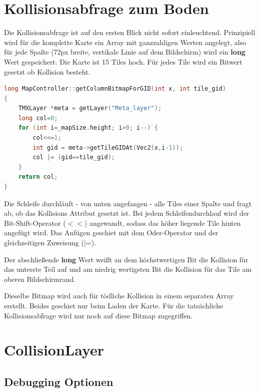 \section{Kollisionsabfrage zum Boden}\label{sec:4_Kollisionsabfrage}

Die Kollisionsabfrage ist auf den ersten Blick nicht sofort einleuchtend. Prinzipiell wird für die komplette Karte ein Array mit ganzzahligen Werten angelegt, also für jede Spalte (72px breite, vertikale Linie auf dem Bildschirm) wird ein \textbf{long} Wert gespeichert.
Die Karte ist 15 Tiles hoch. Für jedes Tile wird ein Bitwert gesetzt ob Kollision besteht.

\begin{lstlisting}[label=lst:collision_detection,
				   language=C++,
				   firstnumber=271,
				   caption=Collision Column abfragen ( MapController.cpp )]
long MapController::getColumnBitmapForGID(int x, int tile_gid)
{
	TMXLayer *meta = getLayer("Meta_layer");
	long col=0;
	for (int i=_mapSize.height; i>0; i--) {
		col<<=1;
		int gid = meta->getTileGIDAt(Vec2(x,i-1));
		col |= (gid==tile_gid);
	}
	return col;
}
\end{lstlisting}

Die Schleife durchläuft - von unten angefangen - alle Tiles einer Spalte und fragt ab, ob das Kollisions Attribut gesetzt ist. Bei jedem Schleifendurchlauf wird der Bit-Shift-Operator ($<<$) angewandt, sodass das höher liegende Tile hinten angefügt wird. Das Anfügen geschiet mit dem Oder-Operator und der gleichzeitigen Zuweisung ($|$=).

Der abschließende \textbf{long} Wert weißt an dem höchstwertigen Bit die Kollision für das unterste Teil auf und am niedrig wertigsten Bit die Kollision für das Tile am oberen Bildschirmrand.

Dieselbe Bitmap wird auch für tödliche Kollision in einem separaten Array erstellt. Beides geschiet nur beim Laden der Karte. Für die tatsächliche Kollisionsabfrage wird nur noch auf diese Bitmap zugegriffen.



\section{CollisionLayer}\label{sec:4_CollisionLayer}
\subsection{Debugging Optionen}\label{sec:CollisionLayerDebug}

